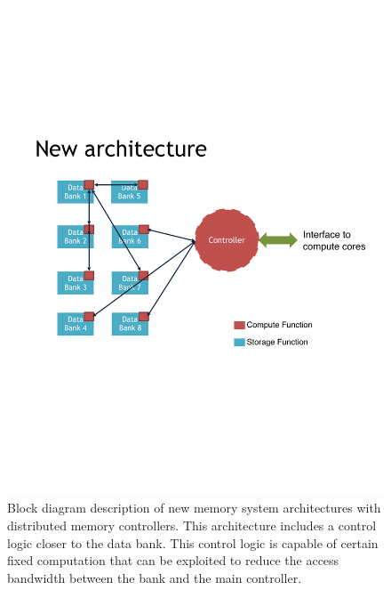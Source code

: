 \begin{figure}[t!]
\centering
\includegraphics[width=1\linewidth]{figures/New_architecture.pdf}
\caption{Block diagram description of new memory system architectures with distributed memory controllers. This architecture includes a control logic closer to the data bank. This control logic is capable of certain fixed computation that can be exploited to reduce the access bandwidth between the bank and the main controller.%
}
\label{fig:HBM}
\end{figure}


